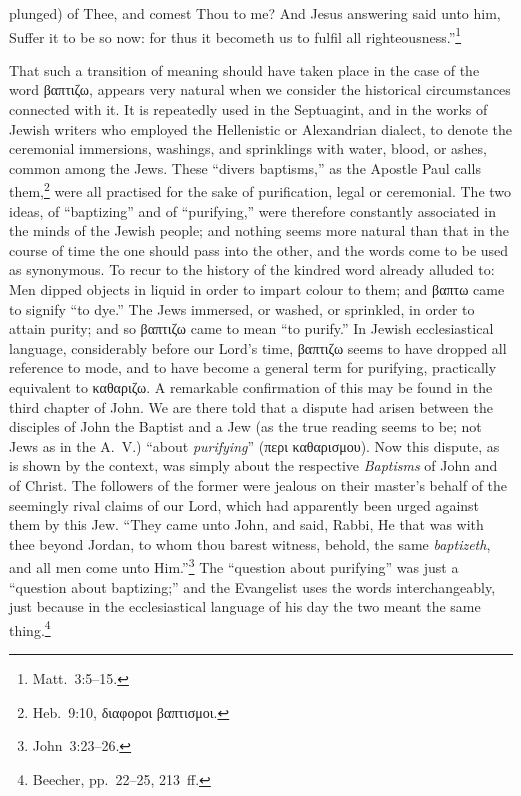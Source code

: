 \documentclass[
]{book}
\begin{document}
plunged) of Thee, and comest Thou to me? And Jesus answering said unto him, Suffer it to be so now: for thus it becometh us to fulfil all righteousness.''\footnote{Matt.~3:5--15.}

That such a transition of meaning should have taken place in the case of the word \foreignlanguage{greek}{βαπτιζω}, appears very natural when we consider the historical circumstances connected with it. It is repeatedly used in the Septuagint, and in the works of Jewish writers who employed the Hellenistic or Alexandrian dialect, to denote the ceremonial immersions, washings, and sprinklings with water, blood, or ashes, common among the Jews. These ``divers baptisms,'' as the Apostle Paul calls them,\footnote{Heb.~9:10, \foreignlanguage{greek}{διαφοροι βαπτισμοι}.} were all practised for the sake of purification, legal or ceremonial. The two ideas, of ``baptizing'' and of ``purifying,'' were therefore constantly associated in the minds of the Jewish people; and nothing seems more natural than that in the course of time the one should pass into the other, and the words come to be used as synonymous. To recur to the history of the kindred word already alluded to: Men dipped objects in liquid in order to impart colour to them; and \foreignlanguage{greek}{βαπτω} came to signify ``to dye.'' The Jews immersed, or washed, or sprinkled, in order to attain purity; and so \foreignlanguage{greek}{βαπτιζω} came to mean ``to purify.'' In Jewish ecclesiastical language, considerably before our Lord's time, \foreignlanguage{greek}{βαπτιζω} seems to have dropped all reference to mode, and to have become a general term for purifying, practically equivalent to \foreignlanguage{greek}{καθαριζω}. A remarkable confirmation of this may be found in the third chapter of John. We are there told that a dispute had arisen between the disciples of John the Baptist and a Jew (as the true reading seems to be; not Jews as in the A.~V.) ``about \emph{purifying}'' (\foreignlanguage{greek}{περι καθαρισμου}). Now this dispute, as is shown by the context, was simply about the respective \emph{Baptisms} of John and of Christ. The followers of the former were jealous on their master's behalf of the seemingly rival claims of our Lord, which had apparently been urged against them by this Jew. ``They came unto John, and said, Rabbi, He that was with thee beyond Jordan, to whom thou barest witness, behold, the same \emph{baptizeth}, and all men come unto Him.''\footnote{John~3:23--26.} The ``question about purifying'' was just a ``question about baptizing;'' and the Evangelist uses the words interchangeably, just because in the ecclesiastical language of his day the two meant the same thing.\footnote{Beecher, pp.~22--25, 213~ff.}
\end{document}
